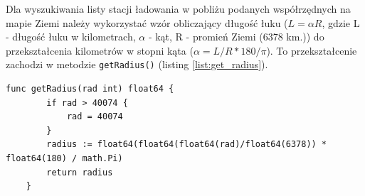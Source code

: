 
Dla wyszukiwania listy stacji ładowania w pobliżu podanych współrzędnych na mapie Ziemi należy wykorzystać wzór obliczający długość łuku (${L = \alpha R}$, gdzie L - długość łuku w kilometrach, ${\alpha}$ - kąt, R - promień Ziemi (6378 km.)) do przekształcenia kilometrów w stopni kąta (${\alpha = L/R*180/\pi}$). To przekształcenie zachodzi w metodzie \texttt{getRadius()} (listing \ref{list:get_radius}).
\begin{lstlisting}[label=list:get_radius,caption=Obliczenie dystansu przeszukiwania,basicstyle=\tiny\ttfamily]
    func getRadius(rad int) float64 {
        if rad > 40074 {
            rad = 40074
        }
        radius := float64(float64(float64(rad)/float64(6378)) * float64(180) / math.Pi)
        return radius
    }
\end{lstlisting}

